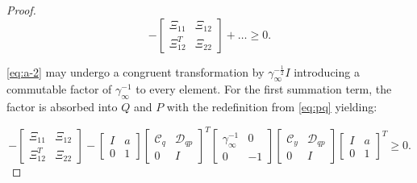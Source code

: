 \begin{proof}
	\begin{equation} \label{eq:a-2}
		-\begin{bmatrix}
			\Xi_{11} & \Xi_{12} \\
			\Xi_{12}^T & \Xi_{22}
		\end{bmatrix} + \ldots
		\geq 0.
	\end{equation}

	\autoref{eq:a-2} may undergo a congruent transformation by $\gamma_\infty^{-\frac{1}{2}}I$ introducing a commutable factor of $\gamma_\infty^{-1}$ to every element. For the first summation term, the factor is absorbed into $Q$ and $P$ with the redefinition from \autoref{eq:pq} yielding:

	\begin{equation} \label{eq:a-3}
		-\begin{bmatrix}
			\Xi_{11} & \Xi_{12} \\
			\Xi_{12}^T & \Xi_{22}
		\end{bmatrix} - 
		\begin{bmatrix}
			I & a \\
			0 & 1
		\end{bmatrix}
		\begin{bmatrix}
			\mathcal{C}_q & \mathcal{D}_{qp} \\
			0 & I
		\end{bmatrix}^T
		\begin{bmatrix}
			\gamma_\infty^{-1} & 0 \\
			0 & -1
		\end{bmatrix}
		\begin{bmatrix}
			\mathcal{C}_y & \mathcal{D}_{qp} \\
			0 & I
		\end{bmatrix}
		\begin{bmatrix} 
			I & a \\
			0 & 1
		\end{bmatrix}^T
		\geq 0.
	\end{equation}


\end{proof}
